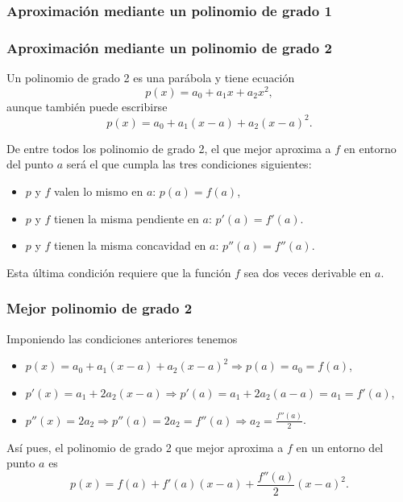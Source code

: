 \begin{frame}
\frametitle{Aproximación mediante un polinomio de grado 1}
\begin{center}
\scalebox{1}{}
\end{center}
\end{frame}


\begin{frame}
\frametitle{Aproximación mediante un polinomio de grado 2}
Un polinomio de grado 2 es una parábola y tiene ecuación
\[p(x) = a_0+a_1x+a_2x^2,\]
aunque también puede escribirse
\[p(x) = a_0+a_1(x-a)+a_2(x-a)^2.\]

De entre todos los polinomio de grado 2, el que mejor aproxima a $f$ en entorno del punto $a$ será el que cumpla las tres condiciones siguientes:
\begin{itemize}
\item[\structure{1-}] $p$ y $f$ valen lo mismo en $a$: $p(a) = f (a)$,
\item[\structure{2-}] $p$ y $f$ tienen la misma pendiente en $a$: $p'(a) = f '(a)$.
\item[\structure{3-}] $p$ y $f$ tienen la misma concavidad en $a$: $p''(a)=f''(a)$.
\end{itemize}
Esta última condición requiere que la función $f$ sea dos veces derivable en $a$.
\end{frame}


\begin{frame}
\frametitle{Mejor polinomio de grado 2}
Imponiendo las condiciones anteriores tenemos
\begin{itemize}
\item[\structure{1-}] $p(x)=a_0+a_1(x-a)+a_2(x-a)^2 \Rightarrow p(a)=a_0=f(a)$,
\item[\structure{2-}] $p'(x)=a_1+2a_2(x-a) \Rightarrow p'(a)=a_1+2a_2(a-a)=a_1=f'(a)$,
\item[\structure{3-}] $p''(x)=2a_2 \Rightarrow p''(a)=2a_2=f''(a) \Rightarrow a_2=\frac{f''(a)}{2}$.
\end{itemize}

Así pues, el polinomio de grado 2 que mejor aproxima a $f$ en un entorno del punto $a$ es
\[p(x) = f(a)+f '(a)(x-a)+\frac{f''(a)}{2}(x-a)^2.\]
\end{frame}


